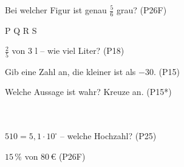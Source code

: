 \documentclass[11pt]{article}
\begin{document}
\small

\begin{aufgabe}{Bei welcher Figur ist genau $\frac{5}{6}$ grau? \hfill (P26F) \\    }

P  \quad Q  \quad R  \quad S 
\end{aufgabe}

\begin{aufgabe}{$\frac{2}{5}$ von $3$ l – wie viel Liter? \hfill (P18) \\ \leerfeld[l]}
\end{aufgabe}

\begin{aufgabe}{Gib eine Zahl an, die kleiner ist als $-30$. \hfill (P15) \\ \leerfeld}
\end{aufgabe}

\begin{aufgabe}{Welche Aussage ist wahr? Kreuze an. \hfill (P15*)\\ \\ \\ }
\end{aufgabe}

\begin{aufgabe}{$510 = 5{,}1 \cdot 10^{\square}$ – welche Hochzahl? \hfill (P25) \\ \leerfeld}
\end{aufgabe}

\begin{aufgabe}{$15\,\%$ von $80\,€$ \hfill (P26F) \\ \leerfeld[€]}
\end{aufgabe}
\end{document}
